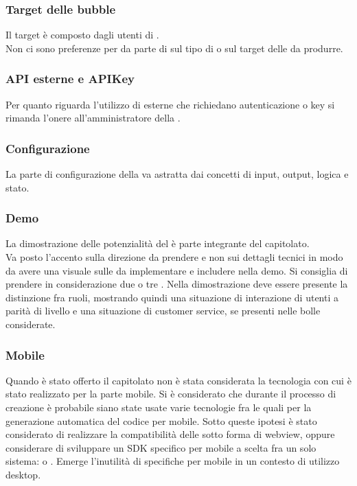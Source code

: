 \subsubsection{Target delle bubble}
Il target è composto dagli utenti di .\\
Non ci sono preferenze per da parte di \Proponente{} sul tipo di  o sul target delle  da produrre. 

\subsubsection{API esterne e APIKey}
Per quanto riguarda l'utilizzo di  esterne che richiedano autenticazione o key si rimanda l'onere all'amministratore della .

\subsubsection{Configurazione}
La parte di configurazione della  va astratta dai concetti di input, output, logica e stato.

\subsubsection{Demo}
La dimostrazione delle potenzialità del  è parte integrante del capitolato.\\
Va posto l'accento sulla direzione da prendere e non sui dettagli tecnici in modo da avere una visuale sulle  da implementare e includere nella demo. Si consiglia di prendere in considerazione due o tre .
Nella dimostrazione deve essere presente la distinzione fra ruoli, mostrando quindi una situazione di interazione di utenti a parità di livello e una situazione di customer service, se presenti nelle bolle considerate. 

\subsubsection{Mobile}
Quando è stato offerto il capitolato non è stata considerata la tecnologia con cui  è stato realizzato per la parte mobile. Si è considerato che durante il processo di creazione è probabile siano state usate varie tecnologie fra le quali  per la generazione automatica del codice per mobile. Sotto queste ipotesi è stato considerato di realizzare la compatibilità delle  sotto forma di webview, oppure considerare di sviluppare un SDK specifico per mobile a scelta fra un solo sistema:  o .  
Emerge l’inutilità di  specifiche per mobile in un contesto di utilizzo desktop.

\clearpage
